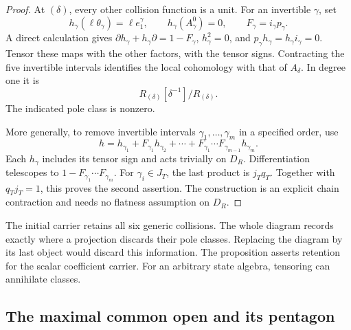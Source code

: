 \begin{proof}
At \((\delta)\), every other collision function is a unit.
For an invertible \(\gamma\), set
\[
 h_\gamma(\ell\theta_\gamma)=\ell e_1^\gamma,
 \qquad h_\gamma(A_\gamma^0)=0,\qquad
 F_\gamma=i_\gamma p_\gamma.
\]
A direct calculation gives
\(\partial h_\gamma+h_\gamma\partial=1-F_\gamma\),
\(h_\gamma^2=0\), and
\(p_\gamma h_\gamma=h_\gamma i_\gamma=0\).
Tensor these maps with the other factors, with the tensor signs.
Contracting the five invertible intervals identifies the local
cohomology with that of \(A_\delta\).  In degree one it is
\[
 R_{(\delta)}[\delta^{-1}]/R_{(\delta)}.
\]
The indicated pole class is nonzero.

More generally, to remove invertible intervals
\(\gamma_1,\ldots,\gamma_m\) in a specified order, use
\begin{equation}\label{fp:eq:four-tensor-contraction}
 h=h_{\gamma_1}+F_{\gamma_1}h_{\gamma_2}
       +\cdots+F_{\gamma_1}\cdots F_{\gamma_{m-1}}h_{\gamma_m}.
\end{equation}
Each \(h_\gamma\) includes its tensor sign and acts trivially
on \(D_R\).  Differentiation telescopes to
\(1-F_{\gamma_1}\cdots F_{\gamma_m}\).
For \(\gamma_i\in J_T\), the last product is \(j_Tq_T\).
Together with \(q_Tj_T=1\), this proves the second assertion.
The construction is an explicit chain contraction and needs no
flatness assumption on \(D_R\).
\end{proof}

The initial carrier retains all six generic collisions.  The whole
diagram records exactly where a projection discards their pole classes.
Replacing the diagram by its last object would discard this information.
The proposition asserts retention for the scalar coefficient carrier.
For an arbitrary state algebra, tensoring can annihilate classes.

\subsection{The maximal common open and its pentagon}
\label{fp:sec:four-coefficient-pentagon}

